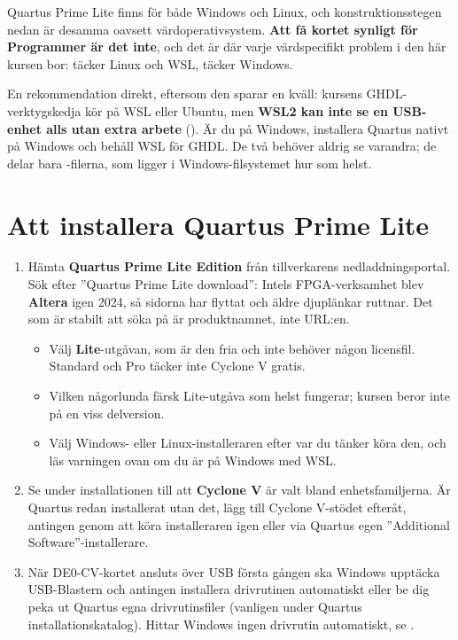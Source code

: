 Quartus Prime Lite finns för både Windows och Linux, och konstruktionsstegen nedan är desamma
oavsett värdoperativsystem. \textbf{Att få kortet synligt för Programmer är det inte}, och det är där
varje värdspecifikt problem i den här kursen bor:  täcker Linux och WSL,
 täcker Windows.

\begin{warning}
En rekommendation direkt, eftersom den sparar en kväll: kursens GHDL-verktygskedja kör på WSL eller
Ubuntu, men \textbf{WSL2 kan inte se en USB-enhet alls utan extra arbete}
(). Är du på Windows, installera Quartus nativt på Windows och behåll WSL
för GHDL. De två behöver aldrig se varandra; de delar bara -filerna, som ligger i
Windows-filsystemet hur som helst.
\end{warning}

\section{Att installera Quartus Prime Lite}
\label{app:quartus:install}

\begin{enumerate}
  \item Hämta \textbf{Quartus Prime Lite Edition} från tillverkarens nedladdningsportal. Sök efter
    ”Quartus Prime Lite download”: Intels FPGA-verksamhet blev \textbf{Altera} igen 2024, så sidorna
    har flyttat och äldre djuplänkar ruttnar. Det som är stabilt att söka på är produktnamnet, inte
    URL:en.
    \begin{itemize}
      \item Välj \textbf{Lite}-utgåvan, som är den fria och inte behöver någon licensfil. Standard
        och Pro täcker inte Cyclone V gratis.
      \item Vilken någorlunda färsk Lite-utgåva som helst fungerar; kursen beror inte på en viss
        delversion.
      \item Välj Windows- eller Linux-installeraren efter var du tänker köra den, och läs varningen
        ovan om du är på Windows med WSL.
    \end{itemize}
  \item Se under installationen till att \textbf{Cyclone V} är valt bland enhetsfamiljerna. Är
    Quartus redan installerat utan det, lägg till Cyclone V-stödet efteråt, antingen genom att köra
    installeraren igen eller via Quartus egen ”Additional Software”-installerare.
  \item När DE0-CV-kortet ansluts över USB första gången ska Windows upptäcka USB-Blastern och
    antingen installera drivrutinen automatiskt eller be dig peka ut Quartus egna drivrutinsfiler
    (vanligen under Quartus installationskatalog). Hittar Windows ingen drivrutin automatiskt, se
    .
\end{enumerate}

